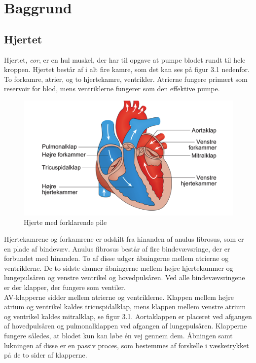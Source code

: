 \chapter{Baggrund}

\section{Hjertet}
Hjertet, \textit{cor}, er en hul muskel, der har til opgave at pumpe blodet rundt til hele kroppen. Hjertet består af i alt fire kamre, som det kan ses på figur 3.1 nedenfor. To forkamre, atrier, og to hjertekamre, ventrikler. Atrierne fungere primært som reservoir for blod, mens ventriklerne fungerer som den effektive pumpe.\\

\begin{figure}[htb]
	\centering
	\includegraphics[width=1\textwidth]{Figurer/Snip20150410_31}
	\caption{Hjerte med forklarende pile \protect\footnotemark} 
\end{figure}

Hjertekamrene og forkamrene er adskilt fra hinanden af anulus fibrosus, som er en plade af bindevæv. Anulus fibrosus består af fire bindevævsringe, der er forbundet med hinanden. To af disse udgør åbningerne mellem atrierne og ventriklerne. De to sidste danner åbningerne mellem højre hjertekammer og lungepulsåren og venstre ventrikel og hovedpulsåren. Ved alle bindevævsringene er der klapper, der fungere som ventiler.\\ 
AV-klapperne sidder mellem atrierne og ventriklerne. Klappen mellem højre atrium og ventrikel kaldes tricuspidalklap, mens klappen mellem venstre atrium og ventrikel kaldes mitralklap, se figur 3.1. Aortaklappen er placeret ved afgangen af hovedpulsåren og pulmonalklappen ved afgangen af lungepulsåren. Klapperne fungere således, at blodet kun kan løbe én vej gennem dem. Åbningen samt lukningen af disse er en passiv proces, som bestemmes af forskelle i væsketrykket på de to sider af klapperne.\\ 

